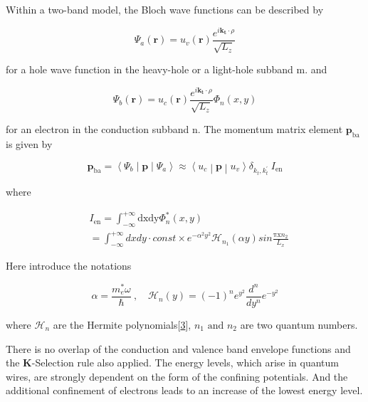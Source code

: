 Within a two-band model, the Bloch wave functions can be described by

\begin{equation}
\Psi_{a}\left( \bm{r} \right) = u_{v}(\bm{r})\frac{e^{i\bm{k}_{\bm{t}} \cdot \rho}}{\sqrt{L_{z}}}
\end{equation}

for a hole wave function in the heavy-hole or a light-hole subband m.
and

\begin{equation}
\Psi_{b}\left( \bm{r} \right) = u_{c}(\bm{r})\frac{e^{i\bm{k}_{\bm{t}} \cdot \rho}}{\sqrt{L_{z}}}\Phi_{n}(x,y)
\end{equation}

for an electron in the conduction subband n. The momentum matrix element
\(\bm{p}_{\text{ba}}\) is given by

\begin{equation}
\bm{p}_{\text{ba}}\bm{=}\left\langle \Psi_{b} \middle| \bm{p} \middle| \Psi_{a} \right\rangle \approx \left\langle u_{c} \middle| \bm{p} \middle| u_{v} \right\rangle\delta_{k_{t},k_{t}^{'}}\ I_{\text{en}}
\end{equation}

where

\begin{eqnarray}
  & I_{\text{en}} = \int_{- \infty}^{+ \infty}{\text{dxdy}\Phi_{n}^{*}\left( x,y \right)} \nonumber \\
  & = \int_{- \infty}^{+ \infty}{dxdy \cdot const \times e^{- \alpha^{2}y^{2}}\mathcal{H}_{n_{1}}(\alpha y)sin\frac{\text{πx}n_{2}}{L_{x}}}
\end{eqnarray}

Here introduce the notations

\begin{equation}
\alpha = \frac{m_{e}^{*}\omega}{\hbar}\ , \quad
\mathcal{H}_{n}\left( y \right) = {( - 1)}^{n}e^{y^{2}}\frac{d^{n}}{dy^{n}}e^{{- y}^{2}}
\end{equation}

where \(\mathcal{H}_{n}\) are the Hermite
polynomials{[}\protect\hyperlink{_ENREF_3}{3}{]},
\(n_{1}\text{\ and\ }n_{2}\) are two quantum numbers.

There is no overlap of the conduction and valence band envelope
functions and the \textbf{K}-Selection rule also applied. The energy
levels, which arise in quantum wires, are strongly dependent on the form
of the confining potentials. And the additional confinement of electrons
leads to an increase of the lowest energy level.

